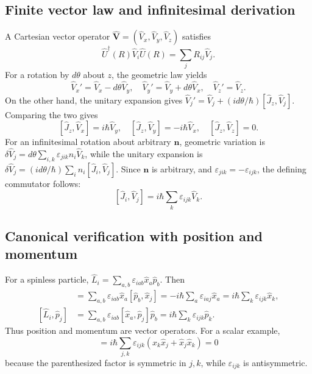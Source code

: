 \documentclass[11pt,a4paper]{article}
\theoremstyle{definition}
\newcommand{\UU}{\hat U}
\begin{document}
\subsection{Finite vector law and infinitesimal derivation}
A Cartesian vector operator \(\hat{\mathbf V}=(\hat V_x,\hat V_y,\hat V_z)\) satisfies
\begin{equation}
\boxed{\UU^\dagger(R)\hat V_i\UU(R)=\sum_jR_{ij}\hat V_j.}
\label{eq:vector-finite}
\end{equation}
For a rotation by \(d\theta\) about \(z\), the geometric law yields
\begin{equation}
\hat V_x'=\hat V_x-d\theta\hat V_y,\quad
\hat V_y'=\hat V_y+d\theta\hat V_x,\quad
\hat V_z'=\hat V_z.
\end{equation}
On the other hand, the unitary expansion gives \(\hat V_j'=\hat V_j+(id\theta/\hbar)[\hat J_z,\hat V_j]\). Comparing the two gives
\begin{equation}
\boxed{[\hat J_z,\hat V_x]=i\hbar\hat V_y,\quad
[\hat J_z,\hat V_y]=-i\hbar\hat V_x,\quad[\hat J_z,\hat V_z]=0.}
\end{equation}
For an infinitesimal rotation about arbitrary \(\mathbf n\), geometric variation is \(\delta\hat V_j=d\theta\sum_{i,k}\varepsilon_{jik}n_i\hat V_k\), while the unitary expansion is \(\delta\hat V_j=(id\theta/\hbar)\sum_i n_i[\hat J_i,\hat V_j]\). Since \(\mathbf n\) is arbitrary, and \(\varepsilon_{jik}=-\varepsilon_{ijk}\), the defining commutator follows:
\begin{equation}
\boxed{[\hat J_i,\hat V_j]=i\hbar\sum_k\varepsilon_{ijk}\hat V_k.}
\label{eq:vector-comm}
\end{equation}
\subsection{Canonical verification with position and momentum}
For a spinless particle, \(\hat L_i=\sum_{a,b}\varepsilon_{iab}\hat x_a\hat p_b\). Then
\begin{align}
[\hat L_i,\hat x_j]
&=\sum_{a,b}\varepsilon_{iab}\hat x_a[\hat p_b,\hat x_j]
=-i\hbar\sum_a\varepsilon_{iaj}\hat x_a
=i\hbar\sum_k\varepsilon_{ijk}\hat x_k,\\
[\hat L_i,\hat p_j]
&=\sum_{a,b}\varepsilon_{iab}[\hat x_a,\hat p_j]\hat p_b
=i\hbar\sum_k\varepsilon_{ijk}\hat p_k.
\end{align}
Thus position and momentum are vector operators. For a scalar example,
\begin{equation}
[\hat L_i,\hat{\mathbf r}^{\,2}]
=i\hbar\sum_{j,k}\varepsilon_{ijk}(\hat x_k\hat x_j+\hat x_j\hat x_k)=0
\end{equation}
because the parenthesized factor is symmetric in \(j,k\), while \(\varepsilon_{ijk}\) is antisymmetric.
\end{document}
